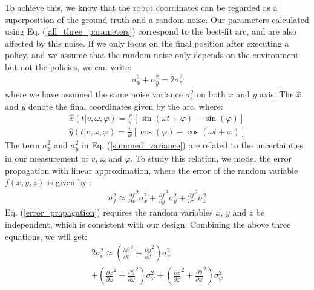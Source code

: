 \documentclass[journal]{IEEEtran}
\begin{document}
To achieve this, we know that the robot coordinates can be regarded as a superposition of the ground truth and a random noise.
Our parameters calculated using Eq. (\ref{all_three_parameters}) correspond to the best-fit arc, and are also affected by this noise.
If we only focus on the final position after executing a policy, and we assume that the random noise only depends on the environment but not the policies, we can write:
%
\begin{equation}
\begin{gathered}
\sigma_{\hat{x}}^2 + \sigma_{\hat{y}}^2 = 2 \sigma_{\epsilon}^2
\end{gathered}
\label{summed_variance}
\end{equation}
%
where we have assumed the same noise variance $\sigma_{\epsilon}^2$ on both $x$ and $y$ axis.
The $\hat{x}$ and $\hat{y}$ denote the final coordinates given by the arc, where:
\begin{equation}
\begin{gathered}
\hat{x}(t | v, \omega, \varphi) 
= \frac{v}{w} \left[ \sin(\omega t + \varphi) - \sin(\varphi) \right]
\\
\hat{y}(t | v, \omega, \varphi) 
= \frac{v}{w} \left[ \cos(\varphi) - \cos(\omega t + \varphi) \right]
\end{gathered}
\label{position_from_arc}
\end{equation}
%
The term $\sigma_{\hat{x}}^2$ and $\sigma_{\hat{y}}^2$ in Eq. (\ref{summed_variance}) are related to the uncertainties in our measurement of $v$, $\omega$ and $\varphi$.
To study this relation, we model the error propagation with linear approximation, where the error of the random variable $f(x, y, z)$ is given by \cite{error_analysis}:
\begin{equation}
\begin{gathered}
\sigma_f^2 \approx
\frac{\partial f}{\partial x}^2 \sigma_x^2
+ \frac{\partial f}{\partial y}^2 \sigma_y^2
+ \frac{\partial f}{\partial z}^2 \sigma_z^2
\end{gathered}
\label{error_prapagation}
\end{equation}
Eq. (\ref{error_prapagation}) requires the random variables $x$, $y$ and $z$ be independent, which is consistent with our design.
Combining the above three equations, we will get:
\begin{equation}
\begin{gathered}
2\sigma_{\epsilon}^2 \approx 
\left(
 \frac{\partial \hat{x}}{\partial v}^2
 + \frac{\partial \hat{y}}{\partial v}^2
\right) \sigma_v^2 
\\ +
\left(
\frac{\partial \hat{x}}{\partial \omega}^2
+
\frac{\partial \hat{y}}{\partial \omega}^2
\right) \sigma_{\omega}^2 
 +
\left(
\frac{\partial \hat{x}}{\partial \varphi}^2
+ 
\frac{\partial \hat{y}}{\partial \varphi}^2
\right) \sigma_{\varphi}^2
\end{gathered}
\label{combined_error_relation}
\end{equation}
\end{document}
